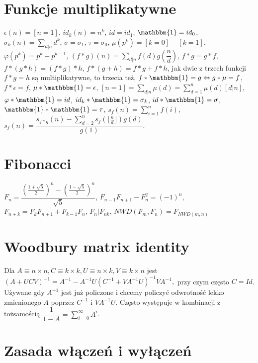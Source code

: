 \section{Funkcje multiplikatywne}
			$\epsilon\left(n\right) = [n = 1]$,
			$id_k\left(n\right) = n^k$, $id = id_1$, $\mathbbm{1} = id_0$,
			$\sigma_k\left(n\right) = \sum_{d|n}d^k$, $\sigma = \sigma_1$, $\tau = \sigma_0$,
			$\mu\left(p^k\right) = [k = 0] - [k = 1]$,
			$\varphi\left(p^k\right) = p^k - p^{k - 1}$,
			$\left(f \ast g\right)\left(n\right) = \sum_{d|n}f\left(d\right)g\left(\dfrac{n}{d}\right)$,
			$f \ast g = g \ast f$,
			$f \ast \left(g \ast h\right) = \left(f \ast g\right) \ast h$,
			$f \ast \left(g + h\right) = f \ast g + f \ast h$,
			jak dwie z trzech funkcji $f \ast g = h$ są multiplikatywne, to trzecia też,
			$f \ast \mathbbm{1} = g \Leftrightarrow g \ast \mu = f$,
			$f \ast \epsilon = f$,
			$\mu \ast \mathbbm{1} = \epsilon$, $[n = 1] = \sum_{d|n}\mu\left(d\right) =\sum_{d=1}^n\mu\left(d\right)[d|n]$,
			$\varphi \ast \mathbbm{1} = id$,
			$id_k \ast \mathbbm{1} = \sigma_k$, $id \ast \mathbbm{1} = \sigma$, $\mathbbm{1} \ast \mathbbm{1} = \tau$,
			$s_f\left(n\right) = \sum_{i=1}^nf\left(i\right)$,
			$s_f\left(n\right) = \dfrac{s_{f\ast g}\left(n\right) - \sum_{d=2}^n s_f\left(\lfloor\frac{n}{d}\rfloor\right)g\left(d\right)}{g\left(1\right)}$.

\section{Fibonacci}

$F_n = \dfrac{\left(\frac{1+\sqrt{5}}{2}\right)^n - \left(\frac{1-\sqrt{5}}{2}\right)^n}{\sqrt{5}}$,
$F_{n-1}F_{n+1}-F_n^2=(-1)^n$, $F_{n+k}=F_k F_{n+1} + F_{k-1} F_n$, $F_n | F_{nk}$, $NWD(F_m, F_n) = F_{NWD(m, n)}$

\section{Woodbury matrix identity}

Dla $A\equiv n\times n, C\equiv k\times k, U\equiv n\times k, V\equiv k\times n$
jest $(A+UCV)^{-1} = A^{-1} - A^{-1}U(C^{-1}+VA^{-1}U)^{-1}VA^{-1},$
przy czym często $C=Id$.
Używane gdy $A^{-1}$ jest już policzone i chcemy policzyć odwrotność lekko zmienionego $A$
poprzez $C^{-1}$ i $VA^{-1}U$.
Często występuje w kombinacji z tożsamością $\dfrac{1}{1-A} = \sum_{i=0}^\infty A^i$.

\section{Zasada włączeń i wyłączeń}

